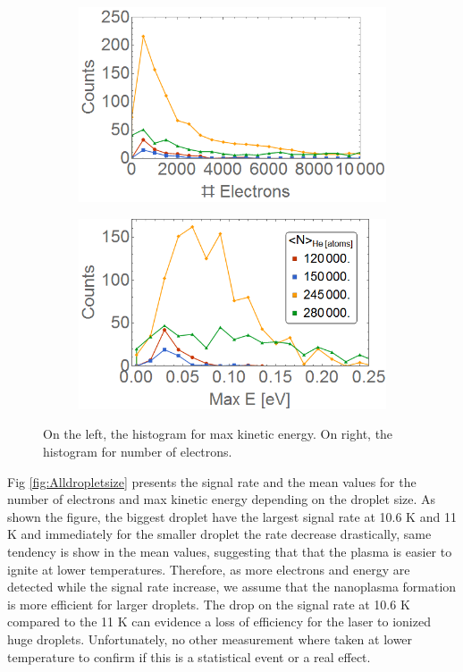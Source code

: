 \begin{figure}[h!]
\centering
\begin{subfigure}[l]{0.49\textwidth}
\includegraphics[width=1\textwidth]{../Images/results/Mir_He_Dropletsize/Helec.png} 
\end{subfigure}
\begin{subfigure}[l]{0.49\textwidth}
\includegraphics[width=1\textwidth]{../Images/results/Mir_He_Dropletsize/Henerg.png}   				\end{subfigure}
\caption[MIR He droplet scan histograms]{On the left, the histogram for max kinetic energy. On right, the histogram for number of electrons.}
\label{fig:histodropletsize}
\end{figure}

Fig \ref{fig:Alldropletsize} presents the signal rate and the mean values for the number of electrons and max kinetic energy depending on the droplet size. As shown the figure, the biggest droplet have the largest signal rate at 10.6 K and 11 K and immediately for the smaller droplet the rate decrease drastically, same tendency is show in the mean values, suggesting that that the plasma is easier to ignite at lower temperatures. Therefore, as more electrons and energy are detected while the signal rate increase, we assume that the nanoplasma formation is more efficient for larger droplets. The drop on the signal rate at 10.6 K compared to the 11 K can evidence a loss of efficiency for the laser to ionized huge droplets. Unfortunately, no other measurement where taken at lower temperature to confirm if this is a statistical event or a real effect.

